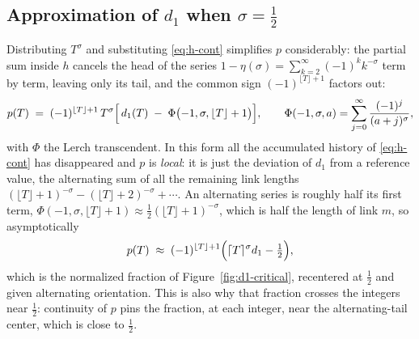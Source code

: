 \documentclass[11pt]{article}
\theoremstyle{definition}
\begin{document}
\subsection{Approximation of \texorpdfstring{$d_1$}{d1} when \texorpdfstring{$\sigma=\tfrac12$}{sigma=1/2}}\label{sec:d1-approx-critical}

Distributing $T^{\sigma}$ and substituting \eqref{eq:h-cont} simplifies $p$
considerably: the partial sum inside $h$ cancels the head of the series
$1-\eta(\sigma)=\sum_{k=2}^{\infty}(-1)^{k}k^{-\sigma}$ term by term, leaving
only its tail, and the common sign $(-1)^{\lfloor T\rfloor+1}$ factors out:
\begin{equation}\label{eq:p-simplified}
p(T) \;=\; (-1)^{\lfloor T\rfloor+1}\, T^{\sigma}
\Bigl[\, d_1(T) \;-\; \Phi\bigl(-1,\sigma,\lfloor T\rfloor+1\bigr) \Bigr],
\qquad
\Phi(-1,\sigma,a) = \sum_{j=0}^{\infty} \frac{(-1)^{j}}{(a+j)^{\sigma}},
\end{equation}
with $\Phi$ the Lerch transcendent. In this form all the accumulated history
of \eqref{eq:h-cont} has disappeared and $p$ is \emph{local}: it is just the
deviation of $d_1$ from a reference value, the alternating sum of all the
remaining link lengths
$(\lfloor T\rfloor+1)^{-\sigma}-(\lfloor T\rfloor+2)^{-\sigma}+\cdots$.
An alternating series is roughly half its first term,
$\Phi(-1,\sigma,\lfloor T\rfloor+1)\approx\tfrac12(\lfloor T\rfloor+1)^{-\sigma}$,
which is half the length of link $m$, so asymptotically
\[
p(T) \;\approx\; (-1)^{\lfloor T\rfloor+1}
\Bigl( \lceil T\rceil^{\sigma} d_1 - \tfrac12 \Bigr),
\]
which is the normalized fraction of Figure~\ref{fig:d1-critical}, recentered
at $\tfrac12$ and given alternating orientation. This is also why that fraction
crosses the integers near $\tfrac12$: continuity of $p$ pins the fraction, at
each integer, near the alternating-tail center, which is close to $\tfrac12$.
\end{document}
